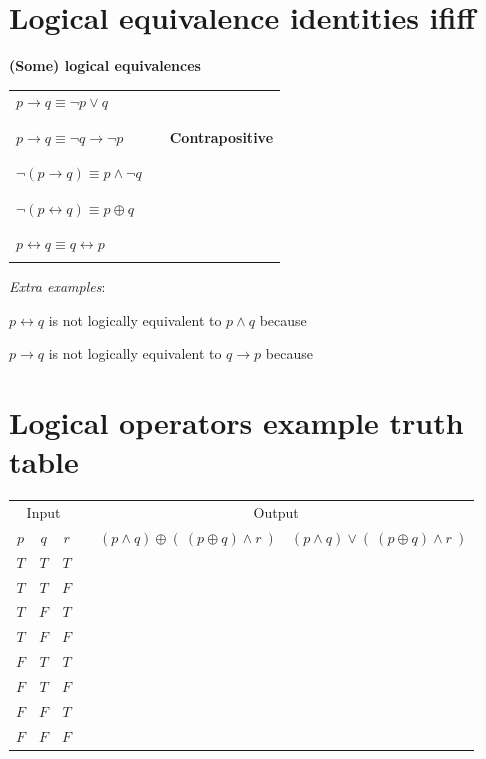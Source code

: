 \documentclass[12pt, oneside]{article}
\begin{document}
\begin{flushright}
\end{flushright} \section*{Logical equivalence identities ififf}


{\bf (Some) logical equivalences}

\begin{tabular}{llp{3in}}
$p \to q \equiv \lnot p \lor q$ & & \\
&& \\
&& \\
$p \to q \equiv \lnot q \to \lnot p$ & &{\bf Contrapositive} \\
&& \\
&& \\
$\lnot (p \to q) \equiv p\land \lnot q$  & &\\
&& \\
&& \\
$\lnot( p \leftrightarrow q) \equiv p \oplus q$ && \\
&& \\
&& \\
$p \leftrightarrow q \equiv q \leftrightarrow p$ &&\\
&& \\
\end{tabular}

\vfill

{\it Extra examples}:

$p \leftrightarrow q$ is not logically equivalent to $p \land q$ because \underline{\phantom{\hspace{4in}}} 

$p \to q$ is not logically equivalent to $q \to p$ because \underline{\phantom{\hspace{4in}}} 
\vfill
 \vfill
\section*{Logical operators example truth table}


\begin{center}
    \begin{tabular}{ccc||p{3in}|c|c}
    \multicolumn{3}{c||}{Input}  & \multicolumn{3}{c}{Output} \\
    $p$ & $q$ & $r$  &  &  $(p \land q) \oplus (~ ( p \oplus q) \land r~)$ & $(p \land q) \vee (~ ( p \oplus q) \land r~)$ \\
    \hline
    $T$ & $T$  & $T$ &   && \\
    $T$ & $T$  & $F$ &   && \\
    $T$ & $F$  & $T$ &   && \\
    $T$ & $F$  & $F$ &   && \\
    $F$ & $T$  & $T$ &   && \\
    $F$ & $T$  & $F$ &   && \\
    $F$ & $F$  & $T$ &   && \\
    $F$ & $F$  & $F$ &   && \\
    \end{tabular}
\end{center}
    \vfill \vfill
\end{document}

